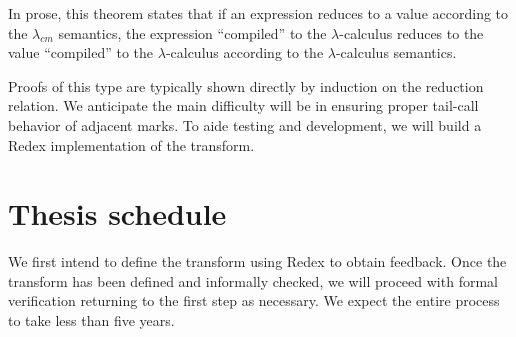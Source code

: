 \documentclass[ms]{byuprop}
\begin{document}
In prose, this theorem states that if an expression reduces to a value according to 
the $\lambda_{cm}$ semantics, the expression ``compiled'' to the $\lambda$-calculus 
reduces to the value ``compiled'' to the $\lambda$-calculus according to the 
$\lambda$-calculus semantics.

Proofs of this type are typically shown directly by induction on the reduction 
relation. We anticipate the main difficulty will be in ensuring proper tail-call 
behavior of adjacent marks. To aide testing and development, we will build a Redex 
\cite{findler2010redex} implementation of the transform.

\section{Thesis schedule}

We first intend to define the transform using Redex to obtain feedback. Once the 
transform has been defined and informally checked, we will proceed with formal 
verification returning to the first step as necessary. We expect the entire process 
to take less than five years.





\end{document}
